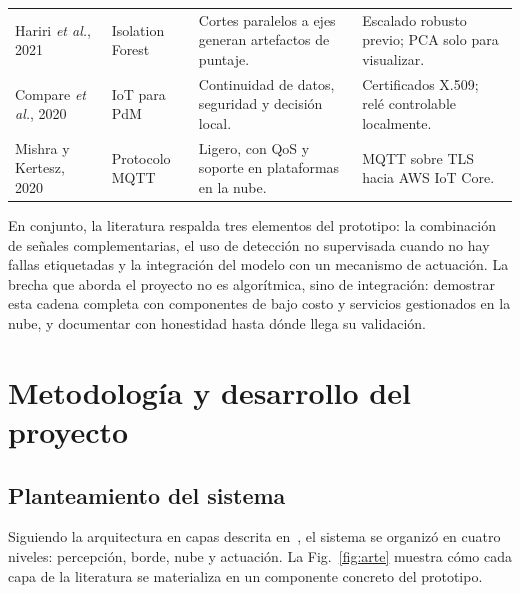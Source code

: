 \documentclass[10pt,twocolumn]{article}
\begin{document}
\begin{table}[t]
\begin{tabularx}{\textwidth}{@{}>{\raggedright\arraybackslash}p{2.7cm}>{\raggedright\arraybackslash}p{2.6cm}>{\raggedright\arraybackslash}X>{\raggedright\arraybackslash}X@{}}
Hariri \emph{et al.}, 2021~\cite{hariri2021} & Isolation Forest &
Cortes paralelos a ejes generan artefactos de puntaje. &
Escalado robusto previo; PCA solo para visualizar. \\
Compare \emph{et al.}, 2020~\cite{compare2020} & IoT para PdM &
Continuidad de datos, seguridad y decisión local. &
Certificados X.509; relé controlable localmente. \\
Mishra y Kertesz, 2020~\cite{mishra2020} & Protocolo MQTT &
Ligero, con QoS y soporte en plataformas en la nube. &
MQTT sobre TLS hacia AWS IoT Core. \\
\bottomrule
\end{tabularx}
\end{table}

En conjunto, la literatura respalda tres elementos del prototipo: la combinación de señales
complementarias, el uso de detección no supervisada cuando no hay fallas etiquetadas y la
integración del modelo con un mecanismo de actuación. La brecha que aborda el proyecto no es
algorítmica, sino de integración: demostrar esta cadena completa con componentes de bajo costo y
servicios gestionados en la nube, y documentar con honestidad hasta dónde llega su validación.

\section{Metodología y desarrollo del proyecto}
\label{sec:metodologia}

\subsection{Planteamiento del sistema}

Siguiendo la arquitectura en capas descrita en~\cite{zhang2019,compare2020}, el sistema se
organizó en cuatro niveles: percepción, borde, nube y actuación. La Fig.~\ref{fig:arte} muestra
cómo cada capa de la literatura se materializa en un componente concreto del prototipo.
\end{document}
